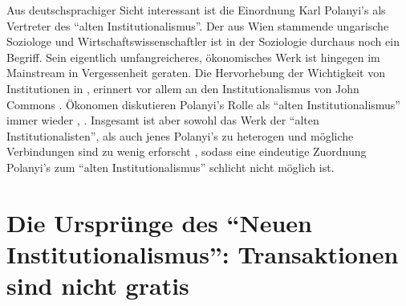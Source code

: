 Aus deutschsprachiger Sicht interessant ist die Einordnung Karl Polanyi's als Vertreter des "`alten Institutionalismus"'. Der aus Wien stammende ungarische Soziologe und Wirtschaftswissenschaftler ist in der Soziologie durchaus noch ein Begriff. Sein eigentlich umfangreicheres, ökonomisches Werk ist hingegen im Mainstream in Vergessenheit geraten. Die Hervorhebung der Wichtigkeit von Institutionen in \textcite{Polanyi1944}, erinnert vor allem an den Institutionalismus von John Commons \parencite{Maucourant1995}. Ökonomen diskutieren Polanyi's Rolle als "`alten Institutionalismus"' immer wieder \parencite[S. 183]{Hodgson1998}, \parencite{Cangiani2011}. Insgesamt ist aber sowohl das Werk der "`alten Institutionalisten"', als auch jenes Polanyi's zu heterogen und mögliche Verbindungen sind zu wenig erforscht \parencite{Frerichs2024}, sodass eine eindeutige Zuordnung Polanyi's zum "`alten Institutionalismus"' schlicht nicht möglich ist.


\section{Die Ursprünge des "`Neuen Institutionalismus"': Transaktionen sind nicht gratis} \label{sec: Neue Inst}

